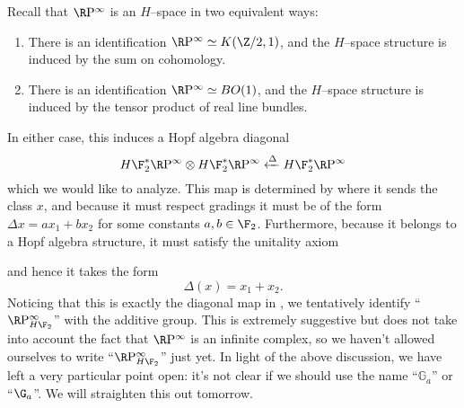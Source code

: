 \begin{example}\label{RPExampleFaulty}
Recall that $\RP^\infty$ is an $H$--space in two equivalent ways:
\begin{enumerate}
\item There is an identification $\RP^\infty \simeq K(\Z/2, 1)$, and the $H$--space structure is induced by the sum on cohomology.
\item There is an identification $\RP^\infty \simeq BO(1)$, and the $H$--space structure is induced by the tensor product of real line bundles.
\end{enumerate}
In either case, this induces a Hopf algebra diagonal \[H\F_2^* \RP^\infty \otimes H\F_2^* \RP^\infty \xleftarrow\Delta H\F_2^* \RP^\infty\] which we would like to analyze.  This map is determined by where it sends the class $x$, and because it must respect gradings it must be of the form $\Delta x = ax_1 + bx_2$ for some constants $a, b \in \F_2$.  Furthermore, because it belongs to a Hopf algebra structure, it must satisfy the unitality axiom
\begin{center}
\end{center}
and hence it takes the form \[\Delta(x) = x_1 + x_2.\]  Noticing that this is exactly the diagonal map in , we tentatively identify ``$\RP^\infty_{H\F_2}$'' with the additive group.  This is extremely suggestive but does not take into account the fact that $\RP^\infty$ is an infinite complex, so we haven't allowed ourselves to write ``$\RP^\infty_{H\F_2}$'' just yet.  In light of the above discussion, we have left a very particular point open: it's not clear if we should use the name ``$\mathbb G_a$'' or ``$\G_a$''.  We will straighten this out tomorrow.
\end{example}








